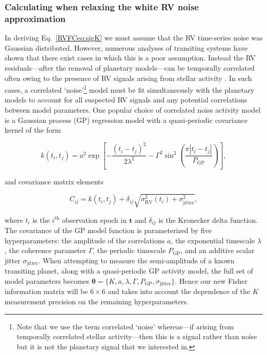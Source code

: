 \subsubsection{Calculating \sigK{} when relaxing the white RV noise approximation} \label{RVFCsect:fisherGP}
In deriving Eq.~\ref{RVFCeq:sigK} we must assume that the RV time-series noise was Gaussian
distributed. However, numerous analyses of transiting systems have shown that there exist cases in which this is
a poor assumption. Instead the RV residuals---after the removal of planetary models---can be temporally correlated
often owing to the presence of RV signals arising from stellar activity
\citep[e.g.][]{haywood14, grunblatt15, lopezmorales16, cloutier17b, dittmann17a}. In
such cases, a correlated `noise'\footnote{Note that we use the term correlated `noise' whereas---if arising
  from temporally correlated stellar activity---then this is a signal rather than noise but it is not the planetary
  signal that we interested in.}
model must be fit simultaneously with the planetary models to account for all suspected
RV signals and any potential correlations between model parameters. One popular choice of
correlated noise activity model is a Gaussian process (GP) regression model with a quasi-periodic covariance kernel
of the form

\begin{equation}
  k(t_i,t_j) = a^2 \exp{\left[ -\frac{(t_i-t_j)^2}{2 \lambda^2}
      -\Gamma^2 \sin^2{\left(\frac{\pi |t_i-t_j|}{P_{\text{GP}}} \right)} \right]},
  \label{RVFCeq:kernel}
\end{equation}

\noindent and covariance matrix elements

\begin{equation}
  C_{ij} = k(t_i,t_j) + \delta_{ij} \sqrt{\sigma_{\text{RV}}^2(t_i) + \sigma_{\text{jitter}}^2},
  \label{RVFCeq:cov}
\end{equation}

\noindent where $t_i$ is the $i^{\text{th}}$ observation epoch in $\mathbf{t}$ and
$\delta_{ij}$ is the Kronecker delta function. The covariance of the GP model function is parameterized
by five hyperparameters: the amplitude of the correlations $a$, the exponential timescale $\lambda$,
the coherence parameter $\Gamma$, the periodic timescale $P_{\text{GP}}$, and an additive scalar jitter
$\sigma_{\text{jitter}}$.
When attempting to measure the semi-amplitude of a known transiting planet, along with a quasi-periodic GP
activity model, the full set of model parameters becomes
$\boldsymbol{\theta} = \{K, a, \lambda, \Gamma, P_{\text{GP}}, \sigma_{\text{jitter}} \}$. Hence our new Fisher
information matrix will be $6 \times 6$ and takes into account the dependence of the $K$
measurement precision on the remaining hyperparameters. \\

